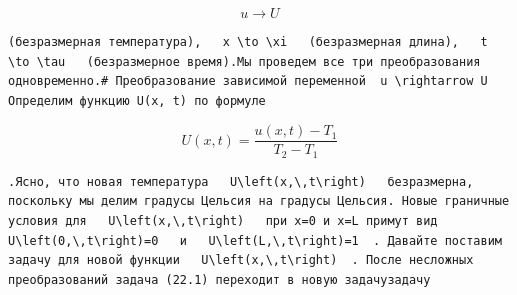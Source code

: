 \documentclass[
  ukrainian,
]{article}
\begin{document}
\[
u \to U
\]

\begin{verbatim}
(безразмерная температура),   x \to \xi   (безразмерная длина),   t \to \tau   (безразмерное время).Мы проведем все три преобразования одновременно.# Преобразование зависимой переменной  u \rightarrow U  Определим функцию U(x, t) по формуле
\end{verbatim}

\[
U(x, t) = \frac{u(x, t) - T_1}{T_2 - T_1}
\]

\begin{verbatim}
.Ясно, что новая температура   U\left(x,\,t\right)   безразмерна, поскольку мы делим градусы Цельсия на градусы Цельсия. Новые граничные условия для   U\left(x,\,t\right)   при x=0 и x=L примут вид   U\left(0,\,t\right)=0   и   U\left(L,\,t\right)=1  . Давайте поставим задачу для новой функции   U\left(x,\,t\right)  . После несложных преобразований задача (22.1) переходит в новую задачузадачу
\end{verbatim}
\end{document}
